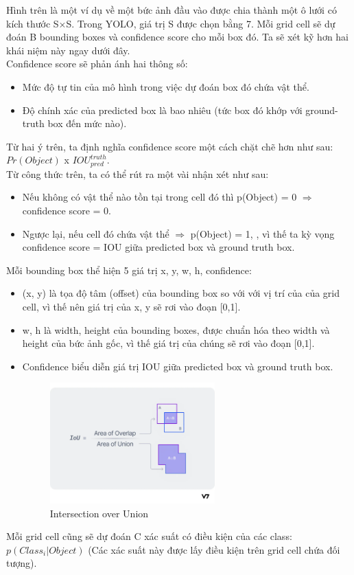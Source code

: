 \noindent Hình trên là một ví dụ về một bức ảnh đầu vào được chia thành một ô lưới có kích thước S×S. Trong YOLO, giá trị S được chọn bằng 7. 
Mỗi grid cell sẽ dự đoán B bounding boxes và confidence score cho mỗi box đó. Ta sẽ xét kỹ hơn hai khái niệm này ngay dưới đây.\\

\noindent Confidence score sẽ phản ánh hai thông số:
\begin{itemize}
    \item Mức độ tự tin của mô hình trong việc dự đoán box đó chứa vật thể.
    \item Độ chính xác của predicted box là bao nhiêu (tức box đó khớp với ground-truth box đến mức nào).
\end{itemize}
Từ hai ý trên, ta định nghĩa confidence score một cách chặt chẽ hơn như sau: $Pr(Object)$ x $IOU^{truth}_{pred}$.\\
Từ công thức trên, ta có thể rút ra một vài nhận xét như sau:
\begin{itemize}
    \item Nếu không có vật thể nào tồn tại trong cell đó thì  p(Object) = 0 $\Rightarrow$ confidence score = 0.
    \item Ngược lại, nếu cell đó chứa vật thể $\Rightarrow$ p(Object) = 1, , vì thế ta kỳ vọng confidence score = IOU giữa predicted box và ground truth box.
\end{itemize}
Mỗi bounding box thể hiện 5 giá trị x, y, w, h, confidence:
\begin{itemize}
    \item (x, y) là tọa độ tâm (offset) của bounding box so với với vị trí của của grid cell, vì thế nên giá trị của x, y sẽ rơi vào đoạn [0,1].
    \item w, h là width, height của bounding boxes, được chuẩn hóa theo width và height của bức ảnh gốc, vì thế giá trị của chúng sẽ rơi vào đoạn [0,1].
    \item Confidence biểu diễn giá trị IOU giữa predicted box và ground truth box.
    \begin{figure}[htbp]
        \centering
        \includegraphics[width=0.6\textwidth]{images/2a-sign/IOU.png}
        \caption{Intersection over Union}
    \end{figure}
\end{itemize}
Mỗi grid cell cũng sẽ dự đoán C xác suất có điều kiện của các class: $p(Class_{i}|Object)$ (Các xác suất này được lấy điều kiện trên grid cell chứa đối tượng).

